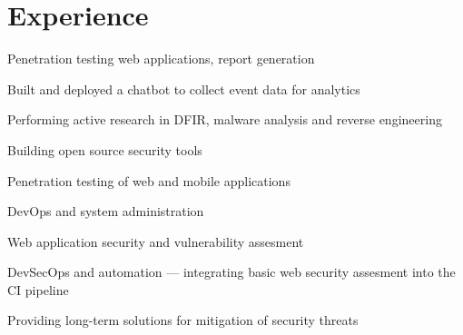 \documentclass[]{resume-openfont}
\begin{document}
\begin{minipage}[t]{0.66\textwidth} 


\section{Experience}
\vspace{\topsep} %
\begin{tightemize}
\item Penetration testing web applications, report generation
\item Built and deployed a chatbot to collect event data for analytics
\end{tightemize}
\sectionsep

\begin{tightemize}
\item Performing active research in DFIR, malware analysis and reverse engineering
\item Building open source security tools	
\end{tightemize}
\sectionsep

\begin{tightemize}
\item Penetration testing of web and mobile applications
\item DevOps and system administration
\end{tightemize}
\sectionsep

\begin{tightemize}
\item Web application security and vulnerability assesment
\item DevSecOps and automation — integrating basic web security assesment into the CI pipeline
\item Providing long-term solutions for mitigation of security threats
\end{tightemize}
\sectionsep


\end{minipage}
\end{document}
